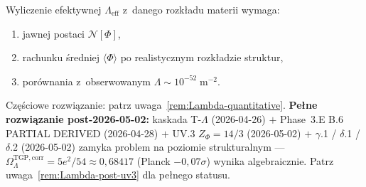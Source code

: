 \begin{problem}\label{prob:Lambda}
Wyliczenie efektywnej $\Lambda_{\mathrm{eff}}$ z~danego
rozk\l{}adu materii wymaga:
\begin{enumerate}[nosep]
  \item jawnej postaci $\mathcal{N}[\Phi]$,
  \item rachunku \'sredniej $\langle\Phi\rangle$ po
        realistycznym rozk\l{}adzie struktur,
  \item por\'ownania z~obserwowanym $\Lambda \sim
        10^{-52}\;\mathrm{m}^{-2}$.
\end{enumerate}
Cz\k{e}\'sciowe rozwi\k{a}zanie: patrz uwaga~\ref{rem:Lambda-quantitative}.
\textbf{Pe\l{}ne rozwi\k{a}zanie post-2026-05-02:} kaskada T-$\Lambda$
(2026-04-26) $+$ Phase~3.E B.6 PARTIAL DERIVED (2026-04-28) $+$ UV.3
$Z_\Phi = 14/3$ (2026-05-02) $+$ $\gamma$.1 / $\delta$.1 / $\delta$.2
(2026-05-02) zamyka problem na poziomie strukturalnym ---
$\Omega_\Lambda^{\mathrm{TGP,corr}} = 5e^2/54 \approx 0{,}68417$
(Planck $-0{,}07\sigma$) wynika algebraicznie. Patrz
uwaga~\ref{rem:Lambda-post-uv3} dla pe\l{}nego statusu.
\end{problem}

